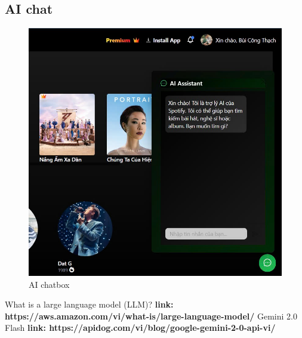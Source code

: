 \documentclass[a4paper]{article}
\begin{document}
\subsection{AI chat}
\begin{figure}[H]
    \centering
    \includegraphics[width=0.6\linewidth]{img/AIchatbox.png}
    \caption{AI chatbox}
    \label{fig:enter-label}
\end{figure}

\newpage
\begin{thebibliography}{80}

What is a large language model (LLM)?
\textbf{link: https://aws.amazon.com/vi/what-is/large-language-model/}
Gemini 2.0 Flash
\textbf{link: https://apidog.com/vi/blog/google-gemini-2-0-api-vi/}

\end{thebibliography}
\end{document}
